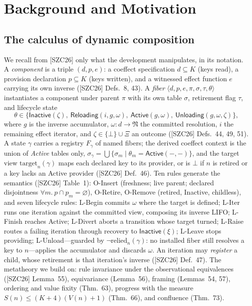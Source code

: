 \documentclass[sigplan,screen,review,nonacm]{acmart}
\newcommand{\target}{\mathrm{target}}
\newcommand{\relied}{\mathrm{relied}}
\newcommand{\Inactive}{\mathsf{Inactive}}
\newcommand{\Reloading}{\mathsf{Reloading}}
\newcommand{\Active}{\mathsf{Active}}
\newcommand{\Unloading}{\mathsf{Unloading}}
\newcommand{\SZC}{[SZC26]}
\begin{document}
\section{Background and Motivation}\label{sec:background}

\subsection{The calculus of dynamic composition}

We recall from \SZC{} only what the development manipulates, in its notation.
A \emph{component} is a triple $(d, p, e)$: a coeffect specification
$d \subseteq K$ (keys read), a provision declaration $p \subseteq K$ (keys
written), and a witnessed effect function $e$ carrying its own inverse
(\SZC{} Defs.~8, 43). A \emph{fiber}
$\langle d, p, e, \pi, \sigma, \tau, \theta\rangle$ instantiates a component
under parent $\pi$ with its own table $\sigma$, retirement flag $\tau$, and
lifecycle state
\[
\theta \in \{\Inactive(\zeta),\ \Reloading(i,g,\omega),\ \Active(g,\omega),\
\Unloading(g,\omega,\zeta)\},
\]
where $g$ is the inverse accumulator, $\omega : d \to \mathfrak N$ the committed
resolution, $i$ the remaining effect iterator, and
$\zeta \in \{\bot\} \cup \Xi$ an outcome (\SZC{} Defs.~44, 49, 51). A state
$\gamma$ carries a registry $F_\gamma$ of named fibers; the derived coeffect
context is the union of \emph{Active} tables only,
$\sigma_\gamma = \bigcup \{\sigma_m \mid \theta_m = \Active(-,-)\}$, and the
target view $\target_n(\gamma)$ maps each declared key to its provider, or is
$\bot$ if $n$ is retired or a key lacks an Active provider (\SZC{} Def.~46).
Ten rules generate the semantics (\SZC{} Table~1): O\mbox{-}Insert (freshness;
live parent; declared disjointness $\forall m.\ p \cap p_m = \varnothing$),
O\mbox{-}Retire, O\mbox{-}Remove (retired, Inactive, childless), and seven
lifecycle rules: L\mbox{-}Begin commits $\omega$ where the target is defined;
L\mbox{-}Iter runs one iteration against the committed view, composing its
inverse LIFO; L\mbox{-}Finish reaches Active; L\mbox{-}Divert aborts a
transition whose target turned; L\mbox{-}Raise routes a failing iteration
through recovery to $\Inactive(\xi)$; L\mbox{-}Leave stops providing;
L\mbox{-}Unload---guarded by $\neg\relied_n(\gamma)$: no installed fiber still
resolves a key to $n$---applies the accumulator and discards $\omega$. An
iteration may \emph{register} a child, whose retirement is that iteration's
inverse (\SZC{} Def.~47). The metatheory we build on: rule invariance under the
observational equivalences (\SZC{} Lemma~55), equivariance (Lemma~56), framing
(Lemmas~54, 57), ordering and value fixity (Thm.~63), progress with the
measure $S(n) \le (K{+}4)(V(n){+}1)$ (Thm.~66), and confluence (Thm.~73).
\end{document}
